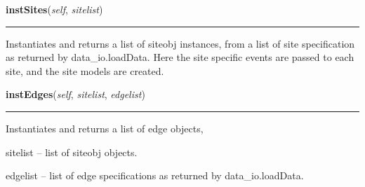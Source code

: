     \label{Epigrass:manager:simulate:instSites}

    \vspace{0.5ex}

    \begin{boxedminipage}{\textwidth}

    \raggedright \textbf{instSites}(\textit{self}, \textit{sitelist})

    \vspace{-1.5ex}

    \rule{\textwidth}{0.5\fboxrule}
    Instantiates and returns a list of siteobj instances, from a list of 
    site specification as returned by data\_io.loadData. Here the site 
    specific events are passed to each site, and the site models are 
    created.

    \vspace{1ex}

    \end{boxedminipage}

    \label{Epigrass:manager:simulate:instEdges}

    \vspace{0.5ex}

    \begin{boxedminipage}{\textwidth}

    \raggedright \textbf{instEdges}(\textit{self}, \textit{sitelist}, \textit{edgelist})

    \vspace{-1.5ex}

    \rule{\textwidth}{0.5\fboxrule}
    Instantiates and returns a list of edge objects,

    sitelist -- list of siteobj objects.

    edgelist -- list of edge specifications as returned by 
    data\_io.loadData.

    \vspace{1ex}

    \end{boxedminipage}

    \label{Epigrass:manager:simulate:instGraph}

